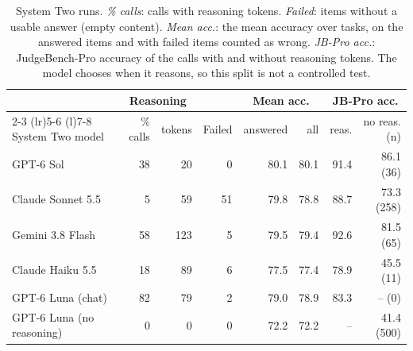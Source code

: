 \begin{table}[t]
\centering
\small
\setlength{\tabcolsep}{4pt}
\begin{tabular}{@{}lrrrrrrr@{}}
\toprule
 & \multicolumn{2}{c}{Reasoning} & & \multicolumn{2}{c}{Mean acc.} & \multicolumn{2}{c}{JB-Pro acc.} \\
\cmidrule(lr){2-3} \cmidrule(lr){5-6} \cmidrule(l){7-8}
System Two model & \% calls & tokens & Failed & answered & all & reas. & no reas. (n) \\
\midrule
GPT-6 Sol & 38 & 20 & 0 & 80.1 & 80.1 & 91.4 & 86.1 (36) \\
Claude Sonnet 5.5 & 5 & 59 & 51 & 79.8 & 78.8 & 88.7 & 73.3 (258) \\
Gemini 3.8 Flash & 58 & 123 & 5 & 79.5 & 79.4 & 92.6 & 81.5 (65) \\
Claude Haiku 5.5 & 18 & 89 & 6 & 77.5 & 77.4 & 78.9 & 45.5 (11) \\
GPT-6 Luna (chat) & 82 & 79 & 2 & 79.0 & 78.9 & 83.3 & -- (0) \\
GPT-6 Luna (no reasoning) & 0 & 0 & 0 & 72.2 & 72.2 & -- & 41.4 (500) \\
\bottomrule
\end{tabular}
\caption{System Two runs. \emph{\% calls}: calls with reasoning tokens. \emph{Failed}: items without a usable answer (empty content). \emph{Mean acc.}: the mean accuracy over tasks, on the answered items and with failed items counted as wrong. \emph{JB-Pro acc.}: JudgeBench-Pro accuracy of the calls with and without reasoning tokens. The model chooses when it reasons, so this split is not a controlled test.}
\label{tab:app-s2}
\end{table}
